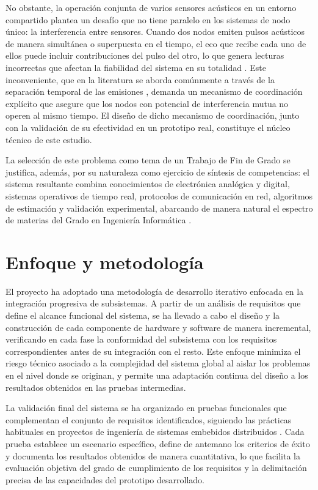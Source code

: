 No obstante, la operación conjunta de varios sensores acústicos en un entorno compartido plantea un desafío que no tiene paralelo en los sistemas de nodo único: la interferencia entre sensores. Cuando dos nodos emiten pulsos acústicos de manera simultánea o superpuesta en el tiempo, el eco que recibe cada uno de ellos puede incluir contribuciones del pulso del otro, lo que genera lecturas incorrectas que afectan la fiabilidad del sistema en su totalidad \cite{9,11}. Este inconveniente, que en la literatura se aborda comúnmente a través de la separación temporal de las emisiones \cite{20,21}, demanda un mecanismo de coordinación explícito que asegure que los nodos con potencial de interferencia mutua no operen al mismo tiempo. El diseño de dicho mecanismo de coordinación, junto con la validación de su efectividad en un prototipo real, constituye el núcleo técnico de este estudio.

La selección de este problema como tema de un Trabajo de Fin de Grado se justifica, además, por su naturaleza como ejercicio de síntesis de competencias: el sistema resultante combina conocimientos de electrónica analógica y digital, sistemas operativos de tiempo real, protocolos de comunicación en red, algoritmos de estimación y validación experimental, abarcando de manera natural el espectro de materias del Grado en Ingeniería Informática \cite{22}.

\section{Enfoque y metodología}

El proyecto ha adoptado una metodología de desarrollo iterativo enfocada en la integración progresiva de subsistemas. A partir de un análisis de requisitos que define el alcance funcional del sistema, se ha llevado a cabo el diseño y la construcción de cada componente de hardware y software de manera incremental, verificando en cada fase la conformidad del subsistema con los requisitos correspondientes antes de su integración con el resto. Este enfoque minimiza el riesgo técnico asociado a la complejidad del sistema global al aislar los problemas en el nivel donde se originan, y permite una adaptación continua del diseño a los resultados obtenidos en las pruebas intermedias.

La validación final del sistema se ha organizado en pruebas funcionales que complementan el conjunto de requisitos identificados, siguiendo las prácticas habituales en proyectos de ingeniería de sistemas embebidos distribuidos \cite{17,18}. Cada prueba establece un escenario específico, define de antemano los criterios de éxito y documenta los resultados obtenidos de manera cuantitativa, lo que facilita la evaluación objetiva del grado de cumplimiento de los requisitos y la delimitación precisa de las capacidades del prototipo desarrollado.

